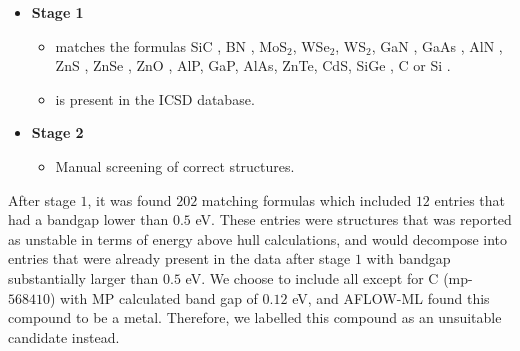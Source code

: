 \begin{itemize}
  \item[]{\textbf{Stage 1}}
  \begin{itemize}
  \item matches the formulas SiC \cite{Neudeck1995, Weber2010, Son2020, Falk2013, Martienssen2005}, BN \cite{Toth2019, Atatuere2018}, MoS$_2$\cite{Atatuere2018}, WSe$_2$\cite{Atatuere2018}, WS$_2$\cite{Atatuere2018}, GaN \cite{Berhane2018}, GaAs \cite{Wang2014}, AlN \cite{Weber2010, Xue2020}, ZnS \cite{Zhang2020}, ZnSe \cite{Weber2010}, ZnO \cite{Zhang2020}, AlP\cite{Weber2010}, GaP\cite{Weber2010}, AlAs\cite{Weber2010}, ZnTe\cite{Weber2010}, CdS\cite{Weber2010}, SiGe \cite{Hardy2019}, C \cite{Taylor2008, Barclay2011, Gordon2013} or Si \cite{Redjem2020, Zhang2020}.
  \item is present in the ICSD database.
  \end{itemize}
  \item[]{\textbf{Stage 2}}
  \begin{itemize}
  \item Manual screening of correct structures.
  \end{itemize}
\end{itemize}

After stage $1$, it was found $202$ matching formulas which included $12$ entries that had a bandgap lower than $0.5$ eV. These entries were structures that was reported as unstable in terms of energy above hull calculations, and would decompose into entries that were already present in the data after stage $1$ with bandgap substantially larger than $0.5$ eV. We choose to include all except for C (mp-$568410$) \cite{mp-568410} with MP calculated band gap of $0.12$ eV, and AFLOW-ML found this compound to be a metal. Therefore, we labelled this compound as an unsuitable candidate instead.




